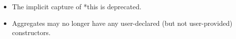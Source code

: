 \begin{itemize}
\item 
The implicit capture of *this is deprecated.

\item 
Aggregates may no longer have any user-declared (but not user-provided) constructors.
\end{itemize}